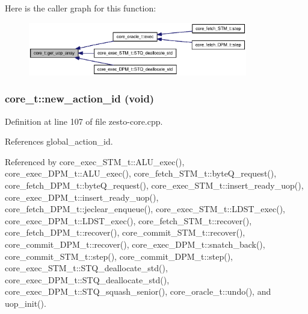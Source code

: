 Here is the caller graph for this function:\nopagebreak
\begin{figure}[H]
\begin{center}
\leavevmode
\includegraphics[width=271pt]{classcore__t_c7fc21b5fb694c21209262c29615fdb7_icgraph}
\end{center}
\end{figure}
\subsubsection[{new\_\-action\_\-id}]{ core\_\-t::new\_\-action\_\-id (void)}\label{classcore__t_110f33d959a11c403fb9166326c7e5f3}




Definition at line 107 of file zesto-core.cpp.

References global\_\-action\_\-id.

Referenced by core\_\-exec\_\-STM\_\-t::ALU\_\-exec(), core\_\-exec\_\-DPM\_\-t::ALU\_\-exec(), core\_\-fetch\_\-STM\_\-t::byteQ\_\-request(), core\_\-fetch\_\-DPM\_\-t::byteQ\_\-request(), core\_\-exec\_\-STM\_\-t::insert\_\-ready\_\-uop(), core\_\-exec\_\-DPM\_\-t::insert\_\-ready\_\-uop(), core\_\-fetch\_\-DPM\_\-t::jeclear\_\-enqueue(), core\_\-exec\_\-STM\_\-t::LDST\_\-exec(), core\_\-exec\_\-DPM\_\-t::LDST\_\-exec(), core\_\-fetch\_\-STM\_\-t::recover(), core\_\-fetch\_\-DPM\_\-t::recover(), core\_\-commit\_\-STM\_\-t::recover(), core\_\-commit\_\-DPM\_\-t::recover(), core\_\-exec\_\-DPM\_\-t::snatch\_\-back(), core\_\-commit\_\-STM\_\-t::step(), core\_\-commit\_\-DPM\_\-t::step(), core\_\-exec\_\-STM\_\-t::STQ\_\-deallocate\_\-std(), core\_\-exec\_\-DPM\_\-t::STQ\_\-deallocate\_\-std(), core\_\-exec\_\-DPM\_\-t::STQ\_\-squash\_\-senior(), core\_\-oracle\_\-t::undo(), and uop\_\-init().

